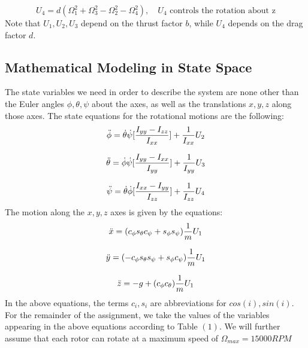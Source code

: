 \documentclass[a4paper,12pt]{article}
\begin{document}
\begin{equation}
    U_4 = d(\Omega_1^2+\Omega_3^2-\Omega_2^2-\Omega_4^2),  \quad \textrm{$U_4$ controls the rotation about z}
\end{equation}
\newline
Note that $U_1,U_2,U_3$ depend on the thrust factor $b$, while $U_4$ depends on the drag factor $d$.
\newpage
\subsection{Mathematical Modeling in State Space}
The state variables we need in order to describe the system are none other than the Euler angles $\phi, \theta, \psi$ about the axes, as well as the translations $x, y, z$ along those axes. The state equations for the rotational motions are the following:
\begin{equation}
    \Ddot{\phi} = \dot{\theta}\dot{\psi}[\frac{I_{yy}-I_{zz}}{I_{xx}}] + \frac{1}{I_{xx}}U_2
\end{equation}

\begin{equation}
    \Ddot{\theta} = \dot{\phi}\dot{\psi}[\frac{I_{yy}-I_{xx}}{I_{yy}}] + \frac{1}{I_{yy}}U_3
\end{equation}

\begin{equation}
    \Ddot{\psi} = \dot{\theta}\dot{\phi}[\frac{I_{xx}-I_{yy}}{I_{zz}}] + \frac{1}{I_{zz}}U_4
\end{equation}
\newline
The motion along the $x, y, z$ axes is given by the equations:
\begin{equation}
    \Ddot{x} = (c_{\phi}s_{\theta}c_{\psi} + s_{\phi}s_{\psi})\frac{1}{m}U_1
\end{equation}

\begin{equation}
    \Ddot{y} = (-c_{\phi}s_{\theta}s_{\psi} + s_{\phi}c_{\psi})\frac{1}{m}U_1
\end{equation}

\begin{equation}
    \Ddot{z} = -g +(c_{\phi}c_{\theta})\frac{1}{m}U_1
\end{equation}
\newline
\noindent
In the above equations, the terms $c_{i}, s_{i}$ are abbreviations for $cos(i), sin(i)$. For the remainder of the assignment, we take the values of the variables appearing in the above equations according to Table $(1)$. We will further assume that each rotor can rotate at a maximum speed of $\Omega_{max} = 15000 RPM$
\end{document}
